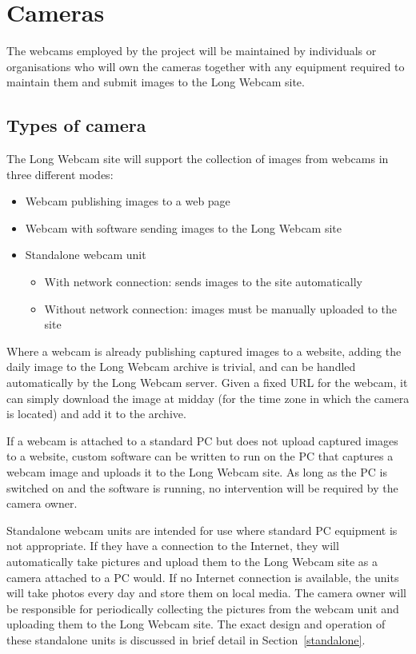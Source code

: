 \documentclass[11pt]{article}
\begin{document}
\section{Cameras}
\label{cameras}
The webcams employed by the project will be maintained by individuals or organisations who will own the cameras together with any equipment required to maintain them and submit images to the Long Webcam site.

\subsection{Types of camera}
\label{sec:camera_types}
The Long Webcam site will support the collection of images from webcams in three different modes:

\begin{itemize}
\item Webcam publishing images to a web page
\item Webcam with software sending images to the Long Webcam site
\item Standalone webcam unit
    \begin{itemize}
    \item With network connection: sends images to the site automatically
    \item Without network connection: images must be manually uploaded to the site
    \end{itemize}
\end{itemize}

Where a webcam is already publishing captured images to a website, adding the daily image to the Long Webcam archive is trivial, and can be handled automatically by the Long Webcam server. Given a fixed URL for the webcam, it can simply download the image at midday (for the time zone in which the camera is located) and add it to the archive.

If a webcam is attached to a standard PC but does not upload captured images to a website, custom software can be written to run on the PC that captures a webcam image and uploads it to the Long Webcam site. As long as the PC is switched on and the software is running, no intervention will be required by the camera owner.

Standalone webcam units are intended for use where standard PC equipment is not appropriate. If they have a connection to the Internet, they will automatically take pictures and upload them to the Long Webcam site as a camera attached to a PC would. If no Internet connection is available, the units will take photos every day and store them on local media. The camera owner will be responsible for periodically collecting the pictures from the webcam unit and uploading them to the Long Webcam site. The exact design and operation of these standalone units is discussed in brief detail in Section~\ref{standalone}.
\end{document}
